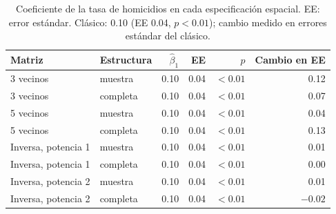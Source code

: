 \begin{table}[!htbp]
\centering
\small
\caption[Coeficiente de la tasa de homicidios en el modelo espacial]{Coeficiente de la tasa de homicidios en cada especificación espacial. EE: error estándar. Clásico: 0.10 (EE 0.04, $p < 0.01$); cambio medido en errores estándar del clásico.}
\label{tab:app_espacial_coeficientes}
\begin{tabular}{l l r r r r}
\toprule
Matriz & Estructura & $\hat{\beta}_1$ & EE & $p$ & Cambio en EE \\
\midrule
3 vecinos & muestra & 0.10 & 0.04 & $<0.01$ & 0.12 \\
3 vecinos & completa & 0.10 & 0.04 & $<0.01$ & 0.07 \\
5 vecinos & muestra & 0.10 & 0.04 & $<0.01$ & 0.04 \\
5 vecinos & completa & 0.10 & 0.04 & $<0.01$ & 0.13 \\
Inversa, potencia 1 & muestra & 0.10 & 0.04 & $<0.01$ & 0.01 \\
Inversa, potencia 1 & completa & 0.10 & 0.04 & $<0.01$ & 0.00 \\
Inversa, potencia 2 & muestra & 0.10 & 0.04 & $<0.01$ & 0.01 \\
Inversa, potencia 2 & completa & 0.10 & 0.04 & $<0.01$ & $-0.02$ \\
\bottomrule
\end{tabular}
\end{table}

